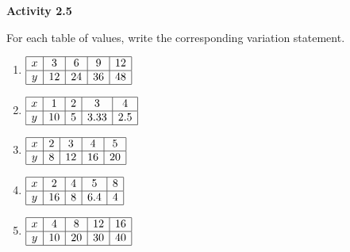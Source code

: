 \vspace{0.3ex}
\noindent\textbf{Activity 2.5}

\vspace{0.2ex}


\noindent For each table of values, write the corresponding variation statement.

\begin{multicols}{2}
\begin{enumerate}[noitemsep, label = \color{blue}\arabic*. ]
    \item 
    $
    \begin{array}{|c|c|c|c|c|}
        \hline
        x & 3 & 6 & 9 & 12 \\ \hline
        y & 12 & 24 & 36 & 48 \\ \hline
    \end{array}
    $
    
    \item 
    $
    \begin{array}{|c|c|c|c|c|}
        \hline
        x & 1 & 2 & 3 & 4 \\ \hline
        y & 10 & 5 & 3.33 & 2.5 \\ \hline
    \end{array}
    $
    
    \item 
    $
    \begin{array}{|c|c|c|c|c|}
        \hline
        x & 2 & 3 & 4 & 5 \\ \hline
        y & 8 & 12 & 16 & 20 \\ \hline
    \end{array}
    $
    
    \item 
    $
    \begin{array}{|c|c|c|c|c|}
        \hline
        x & 2 & 4 & 5 & 8 \\ \hline
        y & 16 & 8 & 6.4 & 4 \\ \hline
    \end{array}
    $
    
    \item 
    $
    \begin{array}{|c|c|c|c|c|}
        \hline
        x & 4 & 8 & 12 & 16 \\ \hline
        y & 10 & 20 & 30 & 40 \\ \hline
    \end{array}
    $
    

\end{enumerate}
\end{multicols}
